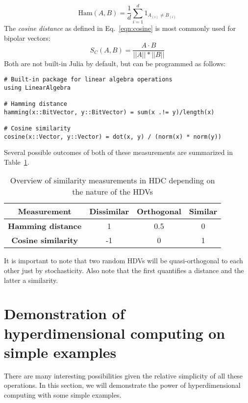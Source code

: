 \begin{equation}
    \label{eqn:Hamming}
    \text{Ham}(A, B) = \frac{1}{d} \sum_{i=1}^{d} 1_{A_{(i)} \neq B_{(i)}}
\end{equation}
The \textit{cosine distance} as defined in Eq.~\ref{eqn:cosine} is most commonly used for bipolar vectors:
\begin{equation}
    \label{eqn:cosine}
    S_{C}(A, B) = \frac{A \cdot B}{||A|| * ||B||}
\end{equation}
Both are not built-in Julia by default, but can be programmed as follows:
\begin{verbatim}
# Built-in package for linear algebra operations 
using LinearAlgebra

# Hamming distance
hamming(x::BitVector, y::BitVector) = sum(x .!= y)/length(x)

# Cosine similarity
cosine(x::Vector, y::Vector) = dot(x, y) / (norm(x) * norm(y))
\end{verbatim}
Several possible outcomes of both of these measurements are summarized in Table~\ref{tab:dist}.
\begin{table}[h]
    \centering
    \caption{\label{tab:dist}Overview of similarity measurements in HDC depending on the nature of the HDVs}
    \begin{tabular}{|cccc|}
        \hline
        \textbf{Measurement} & \textbf{Dissimilar} & \textbf{Orthogonal} & \textbf{Similar} \\
        \hline
        \textbf{Hamming distance} & 1 & 0.5 & 0 \\
        \hline
        \textbf{Cosine similarity} & -1 & 0 & 1 \\
        \hline
    \end{tabular} 
\end{table}

It is important to note that two random HDVs will be quasi-orthogonal to each other just by stochasticity. Also note that the first quantifies a distance and the latter a similarity.
\section{Demonstration of hyperdimensional computing on simple examples}
There are many interesting possibilities given the relative simplicity of all these operations. In this section, we will demonstrate the power of hyperdimensional computing with some simple examples.
